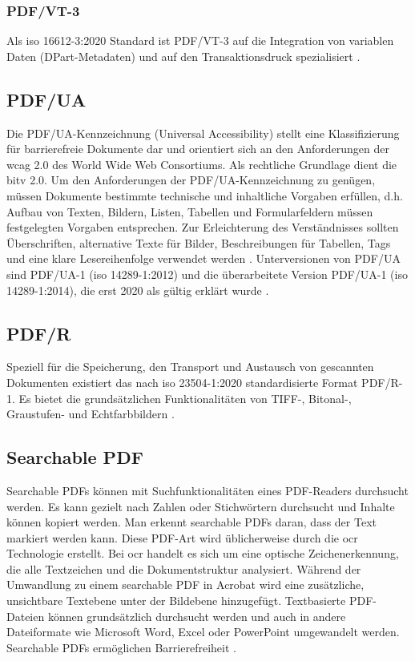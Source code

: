 \subsubsection{PDF/VT-3}
Als \gls{iso} 16612-3:2020 Standard ist PDF/VT-3 auf die Integration von variablen Daten (DPart-Metadaten) und auf den Transaktionsdruck spezialisiert  \cite{proj-consult}.

\subsection{PDF/UA}
Die PDF/UA-Kennzeichnung (Universal Accessibility) stellt eine Klassifizierung für barrierefreie Dokumente dar und orientiert sich an den Anforderungen der \gls{wcag} 2.0 des World Wide Web Consortiums. Als rechtliche Grundlage dient die \gls{bitv} 2.0. Um den Anforderungen der PDF/UA-Kennzeichnung zu genügen, müssen Dokumente bestimmte technische und inhaltliche Vorgaben erfüllen, d.h. Aufbau von Texten, Bildern, Listen, Tabellen und Formularfeldern müssen festgelegten Vorgaben entsprechen. Zur Erleichterung des Verständnisses sollten Überschriften, alternative Texte für Bilder, Beschreibungen für Tabellen, Tags und eine klare Lesereihenfolge verwendet werden \cite{adobe-pdf-ua}. Unterversionen von PDF/UA sind PDF/UA-1 (\gls{iso} 14289-1:2012) und die überarbeitete Version PDF/UA-1 (\gls{iso} 14289-1:2014), die erst 2020 als gültig erklärt wurde \cite{proj-consult}.

\subsection{PDF/R}
Speziell für die Speicherung, den Transport und Austausch von gescannten Dokumenten existiert das nach \gls{iso} 23504-1:2020 standardisierte Format PDF/R-1. Es bietet die grundsätzlichen Funktionalitäten von TIFF-, Bitonal-, Graustufen- und Echtfarbbildern \cite{proj-consult}.  

\subsection{Searchable PDF}
Searchable PDFs können mit Suchfunktionalitäten eines PDF-Readers durchsucht werden. Es kann gezielt nach Zahlen oder Stichwörtern durchsucht und Inhalte können kopiert werden. Man erkennt searchable PDFs daran, dass der Text markiert werden kann. Diese PDF-Art wird üblicherweise durch die \gls{ocr} Technologie erstellt. Bei \gls{ocr} handelt es sich um eine optische Zeichenerkennung, die alle Textzeichen und die Dokumentstruktur analysiert. Während der Umwandlung zu einem searchable PDF in Acrobat wird eine zusätzliche, unsichtbare Textebene unter der Bildebene hinzugefügt. Textbasierte PDF-Dateien können grundsätzlich durchsucht werden und auch in andere Dateiformate wie Microsoft Word, Excel oder PowerPoint umgewandelt werden. Searchable PDFs ermöglichen Barrierefreiheit \cite{adobe-search}. 